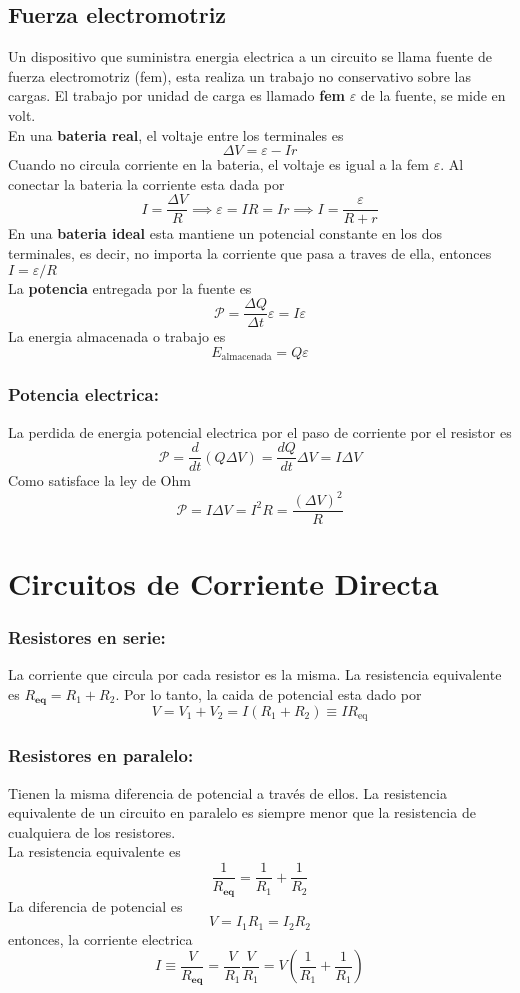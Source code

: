 \documentclass[a4paper, 10pt]{article}
\begin{document}
\begin{multicols*}{2}
	\subsection{Fuerza electromotriz}
	Un dispositivo que suministra energia electrica a un circuito se llama fuente de fuerza electromotriz (fem), esta realiza un trabajo no conservativo sobre las cargas. El trabajo por unidad de carga es llamado \textbf{fem} $\varepsilon$ de la fuente, se mide en volt.\\
	En una \textbf{bateria real}, el voltaje entre los terminales es 
	$$\Delta V=\varepsilon -Ir$$
	Cuando no circula corriente en la bateria, el voltaje es igual a la fem $\varepsilon$. Al conectar la bateria la corriente esta dada por
	$$I=\frac{\Delta V}{R} \implies \varepsilon=IR=Ir \implies I=\frac{\varepsilon}{R+r}$$
	En una \textbf{bateria ideal} esta mantiene un potencial constante en los dos terminales, es decir, no importa la corriente que pasa a traves de ella, entonces $I=\varepsilon/R$\\
	La \textbf{potencia} entregada por la fuente es
	$$\mathcal{P}=\frac{\Delta Q}{\Delta t}\varepsilon=I\varepsilon$$
	La energia almacenada o trabajo es
	$$E_{\text{almacenada}}=Q\varepsilon$$
	    
	\subsubsection{Potencia electrica: }La perdida de energia potencial electrica por el paso de corriente por el resistor es
	$$\mathcal{P}=\frac{d}{dt}(Q\Delta V) =\frac{dQ}{dt}\Delta V=I\Delta V$$
	Como satisface la ley de Ohm
	$$\mathcal{P}=I\Delta V =I^2R=\frac{(\Delta V)^2}{R}$$
	    
	\section{Circuitos de Corriente Directa}
	\subsubsection{Resistores en serie:} La corriente que circula por cada resistor es la misma.
	La resistencia equivalente es $R_{\textbf{eq}}=R_1+R_2$. Por lo tanto, la caida de potencial esta dado por
	$$V=V_1+V_2=I(R_1+R_2)\equiv IR_{\text{eq}}$$
	    
	\subsubsection{Resistores en paralelo:}
  Tienen la misma diferencia de potencial a través de ellos.
  La resistencia equivalente de un circuito en paralelo es siempre menor que la resistencia de cualquiera de los resistores.\\La resistencia equivalente es 
  $$\frac{1}{R_{\textbf{eq}}}=\frac{1}{R_1}+\frac{1}{R_2}$$
  La diferencia de potencial es
	$$V=I_1R_1=I_2R_2$$
	entonces, la corriente electrica
	$$I\equiv \frac{V}{R_{\textbf{eq}}}=\frac{V}{R_1}\frac{V}{R_1}=V(\frac{1}{R_1}+\frac{1}{R_1})$$
	    

\end{multicols*}
\end{document}
